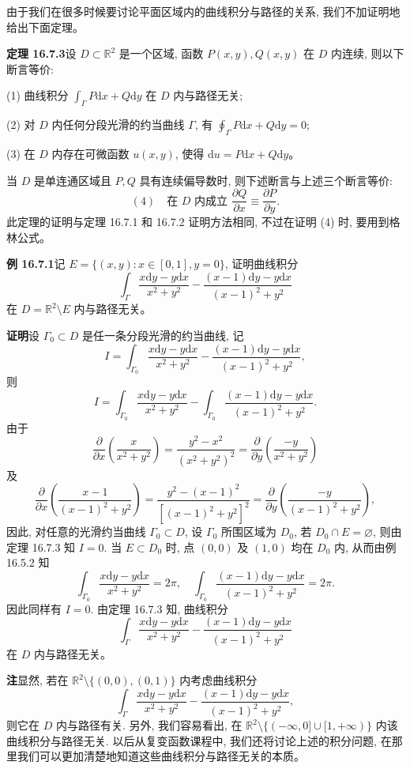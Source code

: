 \documentclass[UTF8,12pt,a4paper,fontset=fandol]{ctexart}
\begin{document}
由于我们在很多时候要讨论平面区域内的曲线积分与路径的关系, 我们不加证明地给出下面定理。

\noindent\textbf{定理 16.7.3}\quad 设 $D\subset\mathbb R^2$ 是一个区域, 函数 $P(x,y),Q(x,y)$ 在 $D$ 内连续, 则以下断言等价:

(1) 曲线积分 $\int_\Gamma P\mathrm dx+Q\mathrm dy$ 在 $D$ 内与路径无关;

(2) 对 $D$ 内任何分段光滑的约当曲线 $\Gamma$, 有 $\oint_\Gamma P\mathrm dx+Q\mathrm dy=0$;

(3) 在 $D$ 内存在可微函数 $u(x,y)$, 使得 $\mathrm du=P\mathrm dx+Q\mathrm dy$。

当 $D$ 是单连通区域且 $P,Q$ 具有连续偏导数时, 则下述断言与上述三个断言等价:
\[
  (4)\quad \text{在 }D\text{ 内成立 }\frac{\partial Q}{\partial x}\equiv\frac{\partial P}{\partial y}.
\]
此定理的证明与定理 16.7.1 和 16.7.2 证明方法相同, 不过在证明 (4) 时, 要用到格林公式。

\noindent\textbf{例 16.7.1}\quad 记 $E=\{(x,y):x\in[0,1],y=0\}$, 证明曲线积分
\[
  \int_\Gamma\frac{x\mathrm dy-y\mathrm dx}{x^2+y^2}
  -\frac{(x-1)\mathrm dy-y\mathrm dx}{(x-1)^2+y^2}
\]
在 $D=\mathbb R^2\setminus E$ 内与路径无关。

\noindent\textbf{证明}\quad 设 $\Gamma_0\subset D$ 是任一条分段光滑的约当曲线, 记
\[
  I=\int_{\Gamma_0}\frac{x\mathrm dy-y\mathrm dx}{x^2+y^2}
  -\frac{(x-1)\mathrm dy-y\mathrm dx}{(x-1)^2+y^2},
\]
则
\[
  I=\int_{\Gamma_0}\frac{x\mathrm dy-y\mathrm dx}{x^2+y^2}
  -\int_{\Gamma_0}\frac{(x-1)\mathrm dy-y\mathrm dx}{(x-1)^2+y^2}.
\]
由于
\[
  \frac{\partial}{\partial x}\left(\frac{x}{x^2+y^2}\right)
  =\frac{y^2-x^2}{(x^2+y^2)^2}
  =\frac{\partial}{\partial y}\left(\frac{-y}{x^2+y^2}\right)
\]
及
\[
  \frac{\partial}{\partial x}\left(\frac{x-1}{(x-1)^2+y^2}\right)
  =\frac{y^2-(x-1)^2}{[(x-1)^2+y^2]^2}
  =\frac{\partial}{\partial y}\left(\frac{-y}{(x-1)^2+y^2}\right),
\]
因此, 对任意的光滑约当曲线 $\Gamma_0\subset D$, 设 $\Gamma_0$ 所围区域为 $D_0$, 若 $D_0\cap E=\varnothing$, 则由定理 16.7.3 知 $I=0$. 当 $E\subset D_0$ 时, 点 $(0,0)$ 及 $(1,0)$ 均在 $D_0$ 内, 从而由例 16.5.2 知
\[
  \int_{\Gamma_0}\frac{x\mathrm dy-y\mathrm dx}{x^2+y^2}=2\pi,
  \quad
  \int_{\Gamma_0}\frac{(x-1)\mathrm dy-y\mathrm dx}{(x-1)^2+y^2}=2\pi.
\]
因此同样有 $I=0$. 由定理 16.7.3 知, 曲线积分
\[
  \int_\Gamma\frac{x\mathrm dy-y\mathrm dx}{x^2+y^2}
  -\frac{(x-1)\mathrm dy-y\mathrm dx}{(x-1)^2+y^2}
\]
在 $D$ 内与路径无关。

\noindent\textbf{注}\quad 显然, 若在 $\mathbb R^2\setminus\{(0,0),(0,1)\}$ 内考虑曲线积分
\[
  \int_\Gamma\frac{x\mathrm dy-y\mathrm dx}{x^2+y^2}
  -\frac{(x-1)\mathrm dy-y\mathrm dx}{(x-1)^2+y^2},
\]
则它在 $D$ 内与路径有关. 另外, 我们容易看出, 在 $\mathbb R^2\setminus\{(-\infty,0]\cup[1,+\infty)\}$ 内该曲线积分与路径无关. 以后从复变函数课程中, 我们还将讨论上述的积分问题, 在那里我们可以更加清楚地知道这些曲线积分与路径无关的本质。
\end{document}
